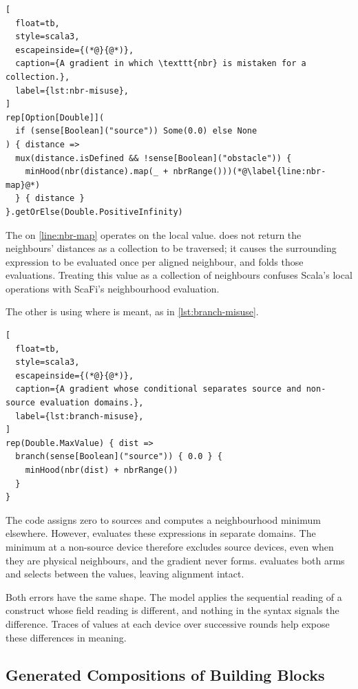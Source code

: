 \begin{lstlisting}[
  float=tb,
  style=scala3,
  escapeinside={(*@}{@*)},
  caption={A gradient in which \texttt{nbr} is mistaken for a collection.},
  label={lst:nbr-misuse},
]
rep[Option[Double]](
  if (sense[Boolean]("source")) Some(0.0) else None
) { distance =>
  mux(distance.isDefined && !sense[Boolean]("obstacle")) {
    minHood(nbr(distance).map(_ + nbrRange()))(*@\label{line:nbr-map}@*)
  } { distance }
}.getOrElse(Double.PositiveInfinity)
\end{lstlisting}

\begingroup
{}
The  on \cref{line:nbr-map} operates on the local  value.
%
 does not return the neighbours' distances as a collection to be traversed;
it causes the surrounding expression to be evaluated once per aligned neighbour,
and  folds those evaluations.
%
Treating this value as a collection of neighbours confuses Scala's local operations with ScaFi's neighbourhood evaluation.
\par
\endgroup

The other is using  where  is meant,
as in \cref{lst:branch-misuse}.

\begin{lstlisting}[
  float=tb,
  style=scala3,
  escapeinside={(*@}{@*)},
  caption={A gradient whose conditional separates source and non-source evaluation domains.},
  label={lst:branch-misuse},
]
rep(Double.MaxValue) { dist =>
  branch(sense[Boolean]("source")) { 0.0 } {
    minHood(nbr(dist) + nbrRange())
  }
}
\end{lstlisting}

The code assigns zero to sources and computes a neighbourhood minimum elsewhere.
However,  evaluates these expressions in separate domains.
The minimum at a non-source device therefore excludes source devices, even when they are physical neighbours, and the gradient never forms.
%
 evaluates both arms and selects between the values, leaving alignment intact.

Both errors have the same shape.
%
The model applies the sequential reading of a construct whose field reading is different,
and nothing in the syntax signals the difference.
%
Traces of values at each device over successive rounds help expose these differences in meaning.

\subsection{Generated Compositions of Building Blocks}
\label{subsec:llm-novelty}

